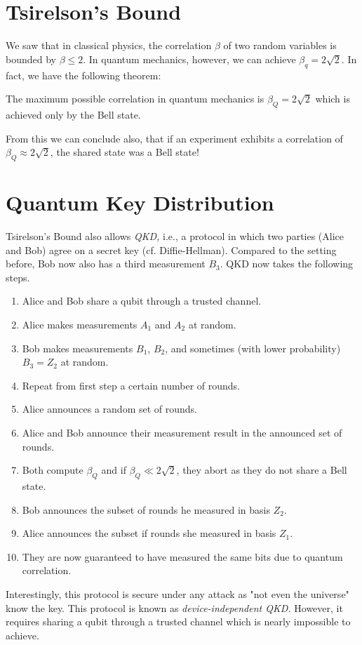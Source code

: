 	\section{Tsirelson's Bound}
		We saw that in classical physics, the correlation \(\beta\) of two random variables is bounded by \(\beta \leq 2\). In quantum mechanics, however, we can achieve \( \beta_q = 2 \sqrt{2} \). In fact, we have the following theorem:
		\begin{theorem}
			The maximum possible correlation in quantum mechanics is \(\beta_Q = 2 \sqrt{2}\) which is achieved only by the Bell state.
		\end{theorem}
		From this we can conclude also, that if an experiment exhibits a correlation of \(\beta_Q \approx 2 \sqrt{2}\), the shared state was a Bell state!

	\section{Quantum Key Distribution}
		Tsirelson's Bound also allows \emph{\ac{QKD},} i.e., a protocol in which two parties (Alice and Bob) agree on a secret key (cf. Diffie-Hellman). Compared to the setting before, Bob now also has a third measurement \(B_3\). \ac{QKD} now takes the following steps.
		\begin{enumerate}
			\item Alice and Bob share a qubit through a trusted channel.
			\item Alice makes measurements \(A_1\) and \(A_2\) at random.
			\item Bob makes measurements \(B_1\), \(B_2\), and sometimes (with lower probability) \(B_3 = Z_2\) at random.
			\item Repeat from first step a certain number of rounds.
			\item Alice announces a random set of rounds.
			\item Alice and Bob announce their measurement result in the announced set of rounds.
			\item Both compute \(\beta_Q\) and if \(\beta_Q \ll 2 \sqrt{2}\), they abort as they do not share a Bell state.
			\item Bob announces the subset of rounds he measured in basis \( Z_2 \).
			\item Alice announces the subset if rounds she measured in basis \( Z_1 \).
			\item They are now guaranteed to have measured the same bits due to quantum correlation.
		\end{enumerate}
		Interestingly, this protocol is secure under any attack as "not even the universe" know the key. This protocol is known as \emph{device-independent \ac{QKD}.} However, it requires sharing a qubit through a trusted channel which is nearly impossible to achieve.

